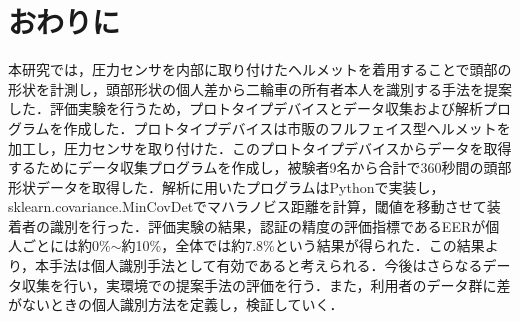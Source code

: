 \chapter{おわりに}
\label{conclude}
本研究では，圧力センサを内部に取り付けたヘルメットを着用することで頭部の形状を計測し，頭部形状の個人差から二輪車の所有者本人を識別する手法を提案した．評価実験を行うため，プロトタイプデバイスとデータ収集および解析プログラムを作成した．プロトタイプデバイスは市販のフルフェイス型ヘルメットを加工し，圧力センサを取り付けた．このプロトタイプデバイスからデータを取得するためにデータ収集プログラムを作成し，被験者9名から合計で360秒間の頭部形状データを取得した．解析に用いたプログラムはPythonで実装し，sklearn.covariance.MinCovDetでマハラノビス距離を計算，閾値を移動させて装着者の識別を行った．評価実験の結果，認証の精度の評価指標であるEERが個人ごとには約0\%$\sim$約10\%，全体では約7.8\%という結果が得られた．この結果より，本手法は個人識別手法として有効であると考えられる．今後はさらなるデータ収集を行い，実環境での提案手法の評価を行う．また，利用者のデータ群に差がないときの個人識別方法を定義し，検証していく．